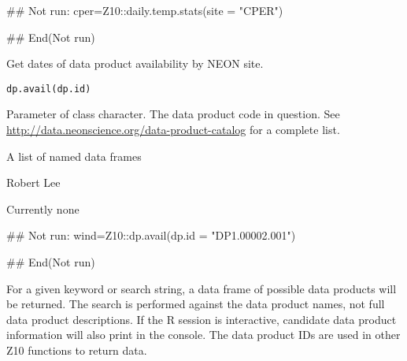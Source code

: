 \documentclass[a4paper]{book}
\begin{document}
%
\begin{Examples}
\begin{ExampleCode}
## Not run: 
cper=Z10::daily.temp.stats(site = "CPER")

## End(Not run)
\end{ExampleCode}
\end{Examples}
%
\begin{Description}\relax
Get dates of data product availability by NEON site.
\end{Description}
%
\begin{Usage}
\begin{verbatim}
dp.avail(dp.id)
\end{verbatim}
\end{Usage}
%
\begin{Arguments}
\begin{ldescription}
\item[\code{dp.id}] Parameter of class character. The data product code in question. See
\url{http://data.neonscience.org/data-product-catalog} for a complete list.
\end{ldescription}
\end{Arguments}
%
\begin{Value}
A list of named data frames
\end{Value}
%
\begin{Author}\relax
Robert Lee \\{}
\end{Author}
%
\begin{SeeAlso}\relax
Currently none
\end{SeeAlso}
%
\begin{Examples}
\begin{ExampleCode}
## Not run: 
wind=Z10::dp.avail(dp.id = "DP1.00002.001")

## End(Not run)
\end{ExampleCode}
\end{Examples}
%
\begin{Description}\relax
For a given keyword or search string, a data frame of possible
data products will be returned. The search is performed against the data product names,
not full data product descriptions.
If the R session is interactive, candidate
data product information will also print in the console.
The data product IDs are used in other Z10 functions to return data.
\end{Description}
\end{document}
